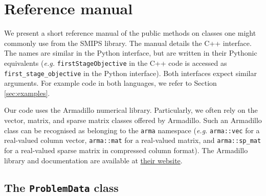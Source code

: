 \documentclass[12pt, english]{article}
\begin{document}
\section{Reference manual}
\label{sec:reference_manual}

We present a short reference manual of the public methods on classes one might commonly use from the
SMIPS library. The manual details the C++ interface. The names are similar in the Python interface, but are written in their Pythonic equivalents (\textit{e.g.} \texttt{firstStageObjective} in the C++ code is accessed as \texttt{first\_stage\_objective} in the Python interface). Both interfaces expect similar arguments. For example code in both languages, we refer to Section \ref{sec:examples}.

Our code uses the Armadillo numerical library. Particularly, we often rely on the vector, matrix, and sparse matrix classes offered by Armadillo. Such an Armadillo class can be recognised as belonging to the \texttt{arma} namespace (\textit{e.g.} \texttt{arma::vec} for a real-valued column vector, \texttt{arma::mat} for a real-valued matrix, and \texttt{arma::sp\_mat} for a real-valued sparse matrix in compressed column format). The Armadillo library and documentation are available at \href{http://arma.sourceforge.net/}{their website}.

\subsection{The \texttt{ProblemData} class}
\label{subsec:problem_class}
\end{document}
